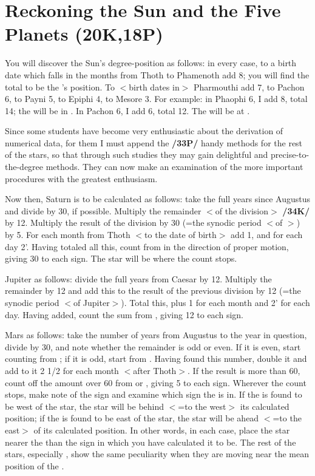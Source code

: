 \section{Reckoning the Sun and the Five Planets (20K,18P)}

You will discover the Sun’s degree-position as follows: in every case, to a birth date which falls in the months from Thoth to Phamenoth add 8\deg; you will find the total to be the \Sun’s position. To $<$birth dates in$>$ Pharmouthi add 7\deg, to Pachon 6\deg, to Payni 5\deg, to Epiphi 4\deg, to Mesore 3\deg. For example: in Phaophi 6, I add 8\deg, total 14; the \Sun\xspace will be in \Libra\xspace 14\deg. In Pachon 6, I add 6\deg, total 12. The \Sun will be at \Taurus\xspace 12\deg.

Since some students have become very enthusiastic about the derivation of numerical data, for them I must append the \textbf{/33P/} handy methods for the rest of the stars, so that through such studies they may gain delightful and precise-to-the-degree methods. They can now make an examination of the more important procedures with the greatest enthusiasm.

Now then, Saturn is to be calculated as follows: take the full years since Augustus and divide by 30, if possible. Multiply the remainder $<$of the division$>$ \textbf{/34K/} by 12\deg. Multiply the result of the division by 30 (=the synodic period $<$of \Saturn$>$) by 5\deg. For each month from Thoth $<$to the date of birth$>$ add 1\deg, and for each day 2'. Having totaled all this, count from \Cancer\xspace in the direction of proper motion, giving 30\deg\xspace to each sign. The star will be where the count stops.

Jupiter as follows: divide the full years from Caesar by 12. Multiply the remainder by 12\deg\xspace and add
this to the result of the previous division by 12 (=the synodic period $<$of Jupiter$>$). Total this, plus 1\deg\xspace for each month and 2' for each day. Having added, count the sum from \Taurus, giving 12 to each sign.

Mars as follows: take the number of years from Augustus to the year in question, divide by 30, and note whether the remainder is odd or even. If it is even, start counting from \Aries; if it is odd, start from \Libra. Having found this number, double it and add to it 2 1/2 for each month $<$after Thoth$>$. If the result is more than 60, count off the amount over 60 from \Libra\xspace or \Aries, giving 5 to each sign. Wherever the count stops, make note of the sign and examine which sign the \Sun\xspace is in. If the \Sun\xspace is found to be west of the star, the star will be behind $<$=to the west$>$ its calculated position; if the \Sun\xspace is found to be east of the star, the star will be ahead $<$=to the east$>$ of its calculated position. In other words, in each case, place the
star nearer the \Sun\xspace than the sign in which you have calculated it to be. The rest of the stars, especially \Venus, show the same peculiarity when they are moving near the mean position of the \Sun.

